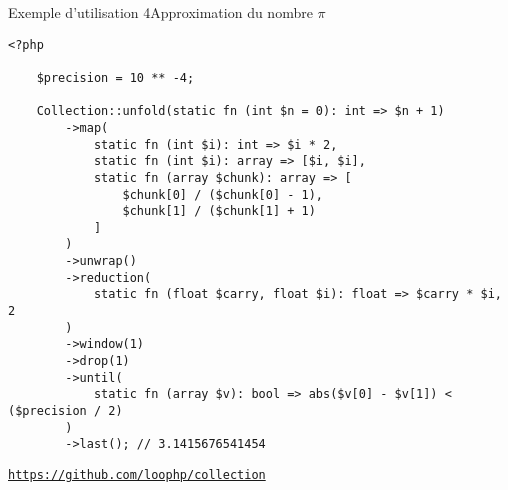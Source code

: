 \begin{frame}[fragile]{Exemple d'utilisation 4}{Approximation du nombre $\pi$}
    \begin{lstlisting}[firstnumber=1]
    <?php

    $precision = 10 ** -4;

    Collection::unfold(static fn (int $n = 0): int => $n + 1)
        ->map(
            static fn (int $i): int => $i * 2,
            static fn (int $i): array => [$i, $i],
            static fn (array $chunk): array => [
                $chunk[0] / ($chunk[0] - 1),
                $chunk[1] / ($chunk[1] + 1)
            ]
        )
        ->unwrap()
        ->reduction(
            static fn (float $carry, float $i): float => $carry * $i, 2
        )
        ->window(1)
        ->drop(1)
        ->until(
            static fn (array $v): bool => abs($v[0] - $v[1]) < ($precision / 2)
        )
        ->last(); // 3.1415676541454
    \end{lstlisting}
\end{frame}

\begin{frame}
    \begin{center}
        {\Large \texttt{\href{https://github.com/loophp/collection}{https://github.com/loophp/collection}}\par}
    \end{center}
\end{frame}
